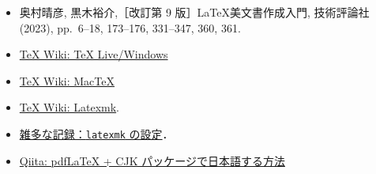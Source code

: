 




\begin{tcolorbox}[title={第~\ref{ch:howtouse}~章の参考文献}, colback=yellow!5!white, colframe=yellow!75!black, coltitle=black]
    \begin{itemize}
        \item 奥村晴彦, 黒木裕介,［改訂第 9 版］\LaTeX 美文書作成入門, 技術評論社 (2023), pp.~6--18, 173--176, 331--347, 360, 361.
        \item \href{https://texwiki.texjp.org/?TeX%20Live%2FWindows}{\TeX{} Wiki: TeX Live/Windows}
        \item \href{https://texwiki.texjp.org/?MacTeX}{\TeX{} Wiki: MacTeX}
        \item \href{https://texwiki.texjp.org/?Latexmk}{\TeX{} Wiki: Latexmk}.
        \item \href{https://www2.yukawa.kyoto-u.ac.jp/~koudai.sugimoto/dokuwiki/doku.php?id=latex:latexmk%E3%81%AE%E8%A8%AD%E5%AE%9A}{雑多な記録：\texttt{latexmk} の設定}．
        \item \href{https://qiita.com/zr_tex8r/items/cdaac1500718eb9fa330}{Qiita: pdfLaTeX + CJK パッケージで日本語する方法}
    \end{itemize}
\end{tcolorbox}



